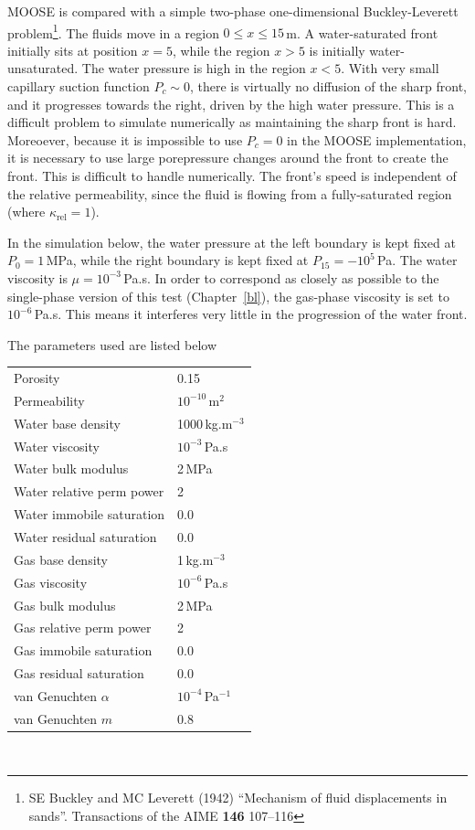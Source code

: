 \documentclass[]{scrreprt}
\begin{document}
MOOSE is compared with a simple two-phase one-dimensional
Buckley-Leverett problem\footnote{SE Buckley and MC Leverett (1942)
  ``Mechanism of fluid displacements in sands''.  Transactions of the
  AIME {\bf 146} 107--116}.  The fluids move in a region
$0\leq x\leq 15$\,m.  A water-saturated front initially sits at
position $x=5$, while the region $x>5$ is initially water-unsaturated.
The water pressure is high in the region $x<5$.  With very small
capillary suction function $P_{c} \sim 0$, there is virtually no
diffusion of the sharp front, and it progresses towards the right,
driven by the high water pressure.  This is a difficult problem to
simulate numerically as maintaining the sharp front is hard.
Moreoever, because it is impossible to use $P_{c}=0$ in the MOOSE
implementation, it is necessary to use large porepressure changes
around the front to create the front.  This is
difficult to handle numerically.  The front's speed is independent of
the relative permeability, since the fluid is flowing from a
fully-saturated region (where $\kappa_{\mathrm{rel}}=1$).


In the simulation below, the water pressure at the left boundary is
kept fixed at $P_{0}=1$\,MPa, while the right boundary is kept fixed
at $P_{15}=-10^{5}$\,Pa.  The water viscosity is $\mu = 10^{-3}$\,Pa.s.  In
order to correspond as closely as possible to the single-phase version
of this test (Chapter~\ref{bl}), the gas-phase viscosity is set to
$10^{-6}$\,Pa.s.  This means it interferes very little in the
progression of the water front.

The parameters used are listed below
\begin{center}
\begin{tabular}{|ll|}
\hline
Porosity & 0.15 \\
Permeability & $ 10^{-10}$\,m$^{2}$ \\
\hline
Water base density & 1000\,kg.m$^{-3}$ \\
Water viscosity & $10^{-3}$\,Pa.s \\
Water bulk modulus & 2\,MPa \\
Water relative perm power & 2 \\
Water immobile saturation & 0.0 \\
Water residual saturation & 0.0 \\
\hline
Gas base density & 1\,kg.m$^{-3}$ \\
Gas viscosity & $10^{-6}$\,Pa.s \\
Gas bulk modulus & 2\,MPa \\
Gas relative perm power & 2 \\
Gas immobile saturation & 0.0 \\
Gas residual saturation & 0.0 \\
\hline
van Genuchten $\alpha$ & $10^{-4}$\,Pa$^{-1}$ \\
van Genuchten $m$ & 0.8 \\
\hline
\end{tabular} \\
\end{center}
\end{document}
